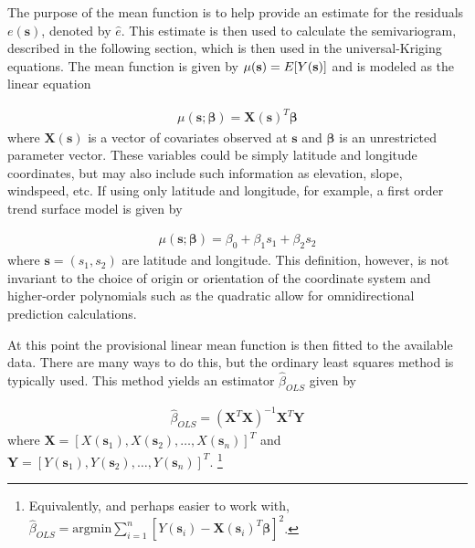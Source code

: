 \documentclass[12pt,twoside]{reedthesis}
\begin{document}
The purpose of the mean function is to help provide an estimate for the residuals $e(\mathbf{s})$, denoted by $\hat e$. This estimate is then used to calculate the semivariogram, described in the following section, which is then used in the universal-Kriging equations. The mean function is given by $\mu(\mathbf{s}) = E[Y(\bold{s})]$ and is modeled as the linear equation

\begin{align*}
\mu(\mathbf{s}; \boldsymbol{\beta}) = \mathbf{X}(\mathbf{s})^T \boldsymbol{\beta}
\end{align*} 
where $\mathbf{X}(\mathbf{s})$ is a vector of covariates observed at $\mathbf{s}$ and $\mathbf{\beta}$ is an unrestricted parameter vector. These variables could be simply latitude and longitude coordinates, but may also include such information as elevation, slope, windspeed, etc. If using only latitude and longitude, for example, a first order  trend surface model is given by

\begin{align*}
\mu(\mathbf{s}; \boldsymbol{\beta}) = \beta_0 + \beta_1s_1 + \beta_2s_2
\end{align*} 
where $\mathbf{s} = (s_1, s_2)$ are latitude and longitude. This definition, however, is not invariant to the choice of origin or orientation of the coordinate system \cite{gelfand:2010} and higher-order polynomials such as the quadratic allow for omnidirectional prediction calculations.


At this point the provisional linear mean function is then fitted to the available data. There are many ways to do this, but the ordinary least squares method is typically used. This method yields an estimator $\hat\beta_{OLS}$ given by 

\begin{align*}
\hat\beta_{OLS} = (\mathbf{X}^T\mathbf{X})^{-1}\mathbf{X}^T\mathbf{Y} 
\end{align*} 
where $\mathbf{X} = [X(\mathbf{s}_1), X(\mathbf{s}_2), \dots, X(\mathbf{s}_n)]^T$ and $\mathbf{Y} = [Y(\mathbf{s}_1), Y(\mathbf{s}_2), \dots, Y(\mathbf{s}_n)]^T$. \footnote{Equivalently, and perhaps easier to work with, $\hat\beta_{OLS} = \text{argmin}\sum_{i=1}^n[Y(\mathbf{s}_i) - \mathbf{X}(\mathbf{s}_i)^T\mathbf{\beta}]^2$.} 
\end{document}
